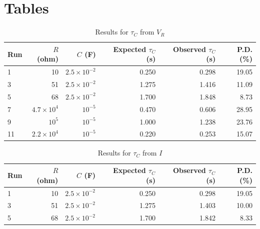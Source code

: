 \section{Tables}
\begin{table}[ht]
    \centering
    \begin{tabular}{|l|r|r|r|r|r|}
        \hline
        Run & $R$ (ohm) & $C$ (F) & Expected $\tau_{C}$ (s) & Observed $\tau_{C}$ (s) & P.D. (\%) \\
        \hline
        1 & 10 & $2.5 \times 10^{-2}$ & 0.250 & 0.298 & 19.05 \\
        3 & 51 & $2.5 \times 10^{-2}$ & 1.275 & 1.416 & 11.09 \\
        5 & 68 & $2.5 \times 10^{-2}$ & 1.700 & 1.848 & 8.73 \\
        7 & $4.7 \times 10^{4}$ & $10^{-5}$ & 0.470 & 0.606 & 28.95 \\
        9 & $10^{5}$ & $10^{-5}$ & 1.000 & 1.238 & 23.76 \\
        11 & $2.2 \times 10^{4}$ & $10^{-5}$ & 0.220 & 0.253 & 15.07 \\
        \hline
    \end{tabular}
    \caption{Results for $\tau_{C}$ from $V_{R}$}
    \label{table.05.results.tauC.VR}
\end{table}
\begin{table}[ht]
    \centering
    \begin{tabular}{|l|r|r|r|r|r|}
        \hline
        Run & $R$ (ohm) & $C$ (F) & Expected $\tau_{C}$ (s) & Observed $\tau_{C}$ (s) & P.D. (\%) \\
        \hline
        1 & 10 & $2.5 \times 10^{-2}$ & 0.250 & 0.298 & 19.05 \\
        3 & 51 & $2.5 \times 10^{-2}$ & 1.275 & 1.403 & 10.00 \\
        5 & 68 & $2.5 \times 10^{-2}$ & 1.700 & 1.842 & 8.33 \\
        \hline
    \end{tabular}
    \caption{Results for $\tau_{C}$ from $I$}
    \label{table.05.results.tauC.I}
\end{table}
